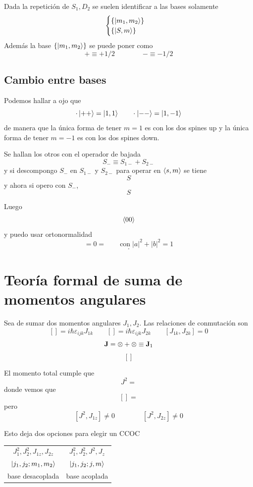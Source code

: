 \documentclass[10pt,oneside]{CBFT_book}
\begin{document}
Dada la repetición de $S_1,D_2$ se suelen identificar a las bases solamente 
\[
	\begin{cases}
	\{ \Ket{m_1,m_2} \} \\
	\{ \Ket{S,m} \}
	\end{cases}
\]
Además la base $\{ \Ket{m_1,m_2}\}$ se puede poner como 
\[
	+ \equiv + 1/2 \qquad\qquad - \equiv - 1/2
\]

\subsection{Cambio entre bases}

Podemos hallar a ojo que 
\[
	\cdot \Ket{++} = \Ket{1,1} \qquad \cdot \Ket{--} = \Ket{1,-1} 
\]
de manera que la única forma de tener $m=1$ es con los dos spines up y la única forma de tener $m=-1$ es con 
los dos 
spines down.

Se hallan los otros con el operador de bajada
\[
	S_- \equiv S_{1-} + S_{2-}
\]
y si descompongo $S_-$ en $S_{1-}$ y $S_{2-}$ para operar en $\Braket{s,m}$ se tiene 
\[
	S
\]
y ahora si opero con $S_-$,
\[
	S
\]

Luego
\[
	\Braket{00}
\]
y puedo usar ortonormalidad 
\[
	= 0 = \qquad \text{con} \; |a|^2 + |b|^2 = 1
\]
\[
	\cdot 
\]


\section{Teoría formal de suma de momentos angulares}

Sea de sumar dos momentos angulares $J_1, J_2$. Las relaciones de conmutación son
\[
	[] = i\hbar \varepsilon_{ijk}J_{1k} \qquad [] = i\hbar \varepsilon_{ijk}J_{2k} \qquad
	[J_{1k},J_{2k}] = 0
\]
\[
	\vb{J} = \otimes + \otimes \equiv \vb{J}_1
\]
\[
	[]
\]

El momento total  cumple que 
\[
	J^2 = 
\]
donde vemos que 
\[
	[] =
\]
pero 
\[
	[ J^2 , J_{1z}] \neq 0  \qquad \qquad [ J^2 , J_{2z}] \neq 0
\]

Esto deja dos opciones para elegir un CCOC

\begin{center}
\begin{tabular}{|c|c|}
\hline 
$J_1^2, J_2^2, J_{1z}, J_{2z}$ & $J_1^2, J_2^2, J^2, J_{z}$ \\
$\Ket{j_1,j_2;m_1,m_2}$ & $\Ket{j_1,j_2;j,m}$ \\
base desacoplada & base acoplada \\
\hline
\end{tabular}
\end{center}
\end{document}
